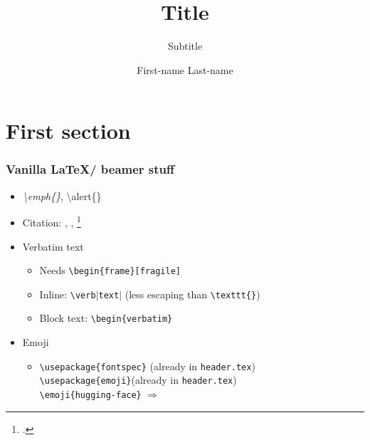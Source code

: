 


\title{Title}
\subtitle{Subtitle}
\author{First-name Last-name} 



\maketitle


\section{First section}
\label{sec:sec1}

\begin{frame}[fragile]       %
\frametitle{Vanilla \LaTeX / beamer stuff}

\begin{itemize}
    \item \emph{\textbackslash emph\{\}}, \alert{\textbackslash alert\{\}}
    \item Citation: \citet{touvron2023llama}, \citep{touvron2023llama}, \footcite{touvron2023llama}
    \item Verbatim text
        \begin{itemize}
            \item Needs \texttt{\textbackslash begin\{frame\}[fragile]}
            \item Inline: \texttt{\textbackslash verb$\vert$text$\vert$} (less
            escaping than \verb|\texttt{}|)
            \item Block text: \texttt{\textbackslash begin\{verbatim\}}
        \end{itemize}
    \item Emoji
        \begin{itemize}
            \item \texttt{\textbackslash usepackage\{fontspec\}} (already in
                \texttt{header.tex})\\
            \texttt{\textbackslash usepackage\{emoji\}}(already in
                \texttt{header.tex})\\
            \texttt{\textbackslash emoji\{hugging-face\}} $\Rightarrow$ 
        \end{itemize}
\end{itemize}
\end{frame}


